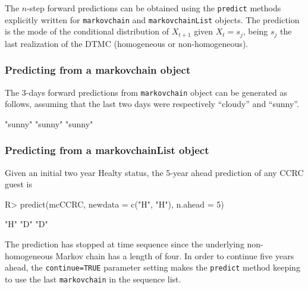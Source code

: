 \documentclass[
  nojss]{jss}
\begin{document}
The \(n\)-step forward predictions can be obtained using the \texttt{predict} methods explicitly written for \texttt{markovchain} and \texttt{markovchainList} objects. The prediction is the mode of the conditional distribution of \(X_{t+1}\) given \(X_{t}=s_{j}\), being \(s_{j}\) the last realization of the DTMC (homogeneous or non-homogeneous).

\hypertarget{predicting-from-a-markovchain-object}{%
\subsubsection{Predicting from a markovchain object}\label{predicting-from-a-markovchain-object}}

The 3-days forward predictions from \texttt{markovchain} object can be generated as follows, assuming that the last two days were respectively ``cloudy'' and ``sunny''.

\begin{CodeChunk}


\begin{CodeOutput}
[1] "sunny" "sunny" "sunny"
\end{CodeOutput}
\end{CodeChunk}

\hypertarget{predicting-from-a-markovchainlist-object}{%
\subsubsection{Predicting from a markovchainList object}\label{predicting-from-a-markovchainlist-object}}

Given an initial two year Healty status, the 5-year ahead prediction of any CCRC guest is

\begin{CodeChunk}

\begin{CodeInput}
R> predict(mcCCRC, newdata = c("H", "H"), n.ahead = 5)
\end{CodeInput}

\begin{CodeOutput}
[1] "H" "D" "D"
\end{CodeOutput}
\end{CodeChunk}

The prediction has stopped at time sequence since the underlying non-homogeneous Markov chain has a length of four. In order to continue five years ahead, the \texttt{continue=TRUE} parameter setting makes the \texttt{predict} method keeping to use the last \texttt{markovchain} in the sequence list.
\end{document}
